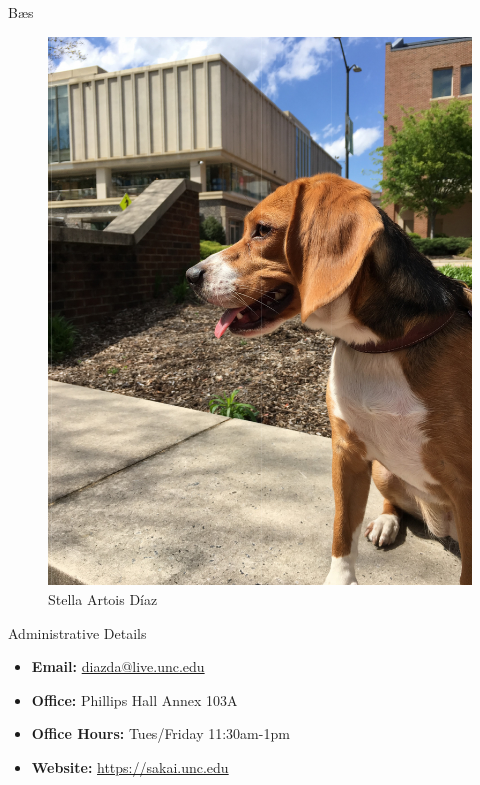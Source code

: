 \documentclass[xcolor={dvipsnames},pdf, hyperref={colorlinks=true, citecolor=ForestGreen, linkcolor=BlueViolet, urlcolor=Magenta}]{beamer}
\begin{document}
\begin{frame}{B\ae s}
	\begin{figure}
		\centering
		\includegraphics[scale=.20]{bae2.pdf}
		\caption{Stella Artois D\'iaz }
	\end{figure}
\end{frame}



\begin{frame}{Administrative Details}
	
	\begin{itemize}
	\item \textbf{Email:} \url{diazda@live.unc.edu} 
	\item \textbf{Office:} Phillips Hall Annex 103A
	\item \textbf{Office Hours:} Tues/Friday 11:30am-1pm
	\item \textbf{Website:} \href{https://sakai.unc.edu/portal/site/2c4d5bc8-5222-46ac-bcad-18681c7e9ce9}{https://sakai.unc.edu}
				
	\end{itemize}
	
\end{frame}
\end{document}
